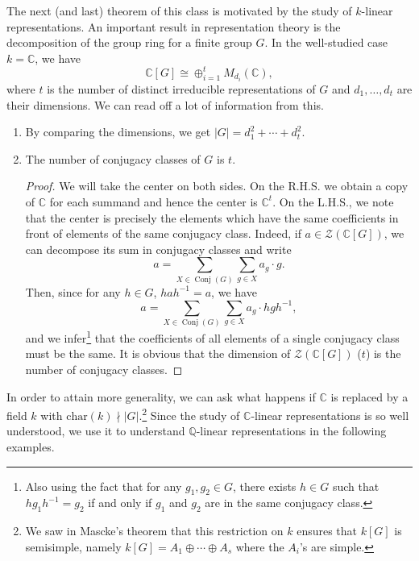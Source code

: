 \documentclass{tufte-handout} %
\theoremstyle{definition}
\theoremstyle{remark}
\newcommand{\mZ}{\mathcal{Z}}
\renewcommand{\C}{\mathbb{C}}
\newcommand{\Q}{\mathbb{Q}}
\DeclareMathOperator{\conjc}{Conj}
\begin{document}
The next (and last) theorem of this class is motivated by the study of $k$-linear representations. An important result in representation theory is the decomposition of the group ring for a finite group $G$. In the well-studied case $k = \C$, we have
\[\C[G] \cong \oplus_{i=1}^t M_{d_i}(\C),\]
where $t$ is the number of distinct irreducible representations of $G$ and $d_1, \dots, d_t$ are their dimensions. We can read off a lot of information from this.
\begin{enumerate}
	\item By comparing the dimensions, we get $|G| = d_1^2 + \cdots + d_t^2$.
	\item The number of conjugacy classes of $G$ is $t$.
	\begin{proof}
		We will take the center on both sides. On the R.H.S. we obtain a copy of $\C$ for each summand and hence the center is $\C^t$. On the L.H.S., we note that the center is precisely the elements which have the same coefficients in front of elements of the same conjugacy class. Indeed, if $a \in \mZ(\C[G])$, we can decompose its sum in conjugacy classes and write
		\[a = \sum_{X \in \conjc(G)} \sum_{g \in X} a_g\cdot g.\]
		Then, since for any $h \in G$, $hah^{-1} = a$, we have
		\[a = \sum_{X \in \conjc(G)} \sum_{g \in X} a_g\cdot hgh^{-1},\]
		and we infer\footnote{Also using the fact that for any $g_1,g_2 \in G$, there exists $h \in G$ such that $hg_1h^{-1} = g_2$ if and only if $g_1$ and $g_2$ are in the same conjugacy class.} that the coefficients of all elements of a single conjugacy class must be the same. It is obvious that the dimension of $\mZ(\C[G])$ ($t$) is the number of conjugacy classes.
	\end{proof}
\end{enumerate}

In order to attain more generality, we can ask what happens if $\C$ is replaced by a field $k$ with $\text{char}(k) \nmid |G|$.\footnote{We saw in Mascke's theorem that this restriction on $k$ ensures that $k[G]$ is semisimple, namely $k[G] = A_1 \oplus \cdots \oplus A_s$ where the $A_i$'s are simple.} Since the study of $\C$-linear representations is so well understood, we use it to understand $\Q$-linear representations in the following examples.
\end{document}
